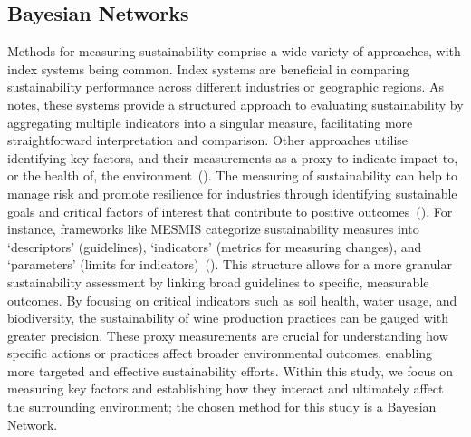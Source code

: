 \documentclass[10pt,letterpaper]{article}
\begin{document}
\subsection*{Bayesian Networks}

% 
Methods for measuring sustainability comprise a wide variety of approaches, with index systems being common. Index systems are beneficial in comparing sustainability performance across different industries or geographic regions. As~\cite{gehringerMappingSustainabilityMeasurement2024} notes, these systems provide a structured approach to evaluating sustainability by aggregating multiple indicators into a singular measure, facilitating more straightforward interpretation and comparison.
Other approaches utilise identifying key factors, and their measurements as a proxy to indicate impact to, or the health of, the environment~(\cite{floresWhatSustainabilityWine2018}). The measuring of sustainability can help to manage risk and promote resilience for industries through identifying sustainable goals and critical factors of interest that contribute to positive outcomes~(\cite{klemesAssessingMeasuringEnvironmental2015, beckerSustainabilityScienceManaging2024}). For instance, frameworks like MESMIS categorize sustainability measures into `descriptors' (guidelines), `indicators' (metrics for measuring changes), and `parameters' (limits for indicators)~(\cite{klemes_assessing_2015}). This structure allows for a more granular sustainability assessment by linking broad guidelines to specific, measurable outcomes. By focusing on critical indicators such as soil health, water usage, and biodiversity, the sustainability of wine production practices can be gauged with greater precision. These proxy measurements are crucial for understanding how specific actions or practices affect broader environmental outcomes, enabling more targeted and effective sustainability efforts. Within this study, we focus on measuring key factors and establishing how they interact and ultimately affect the surrounding environment; the chosen method for this study is a Bayesian Network.
%  
\end{document}
